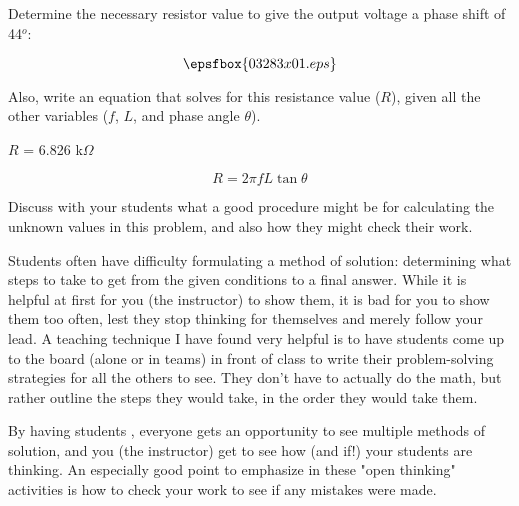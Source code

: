 

Determine the necessary resistor value to give the output voltage a phase shift of 44$^{o}$:

$$\epsfbox{03283x01.eps}$$

Also, write an equation that solves for this resistance value ($R$), given all the other variables ($f$, $L$, and phase angle $\theta$).







$R$ = 6.826 k$\Omega$

$$R = 2 \pi f L \tan \theta$$







Discuss with your students what a good procedure might be for calculating the unknown values in this problem, and also how they might check their work.

\vskip 10pt

Students often have difficulty formulating a method of solution: determining what steps to take to get from the given conditions to a final answer.  While it is helpful at first for you (the instructor) to show them, it is bad for you to show them too often, lest they stop thinking for themselves and merely follow your lead.  A teaching technique I have found very helpful is to have students come up to the board (alone or in teams) in front of class to write their problem-solving strategies for all the others to see.  They don't have to actually do the math, but rather outline the steps they would take, in the order they would take them.

By having students , everyone gets an opportunity to see multiple methods of solution, and you (the instructor) get to see how (and if!) your students are thinking.  An especially good point to emphasize in these "open thinking" activities is how to check your work to see if any mistakes were made.





